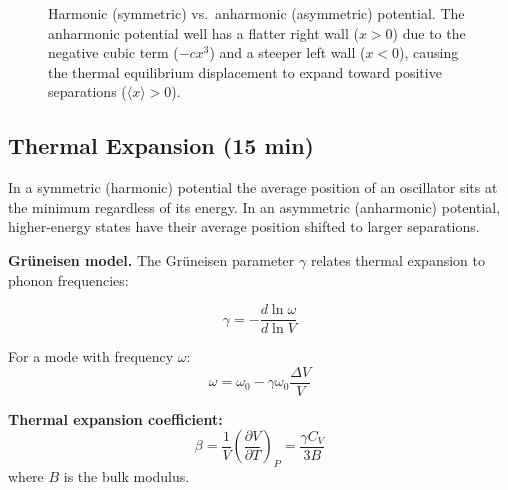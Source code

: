 \documentclass[11pt,a4paper]{article}
\begin{document}
\begin{figure}[h]
\centering
{}
\caption{Harmonic (symmetric) vs.\ anharmonic (asymmetric) potential. The
anharmonic potential well has a flatter right wall ($x > 0$) due to the negative
cubic term ($-c x^3$) and a steeper left wall ($x < 0$), causing the thermal equilibrium
displacement to expand toward positive separations ($\langle x\rangle > 0$).}
\end{figure}

\subsection{Thermal Expansion \hfill \small(15 min)}

\begin{physbox}
In a symmetric (harmonic) potential the average position of an oscillator sits at
the minimum regardless of its energy. In an asymmetric (anharmonic) potential,
higher-energy states have their average position shifted to larger separations.
\end{physbox}

\textbf{Gr\"uneisen model.} The Gr\"uneisen parameter $\gamma$ relates thermal
expansion to phonon frequencies:
\begin{keybox}
\[
\gamma = -\frac{d\ln\omega}{d\ln V}
\]
\end{keybox}
For a mode with frequency $\omega$:
\[
\omega = \omega_0 - \gamma\omega_0\frac{\Delta V}{V}
\]

\textbf{Thermal expansion coefficient:}
\[
\beta = \frac1V\left(\frac{\partial V}{\partial T}\right)_P = \frac{\gamma C_V}{3B}
\]
where $B$ is the bulk modulus.
\end{document}
